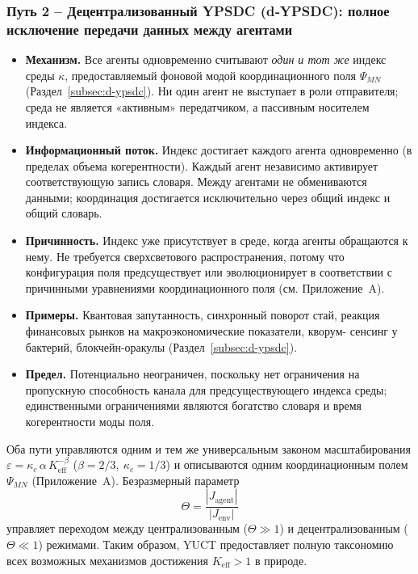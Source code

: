 \documentclass[11pt,a4paper]{article}
\begin{document}
	\subsubsection*{Путь 2 – Децентрализованный YPSDC (d‑YPSDC): полное исключение передачи данных между агентами}
	\begin{itemize}[leftmargin=*]
		\item \textbf{Механизм.} Все агенты одновременно считывают \emph{один и тот же}
		индекс среды \(\kappa\), предоставляемый фоновой модой
		координационного поля \(\Psi_{MN}\) (Раздел~\ref{subsec:d-ypsdc}). Ни один агент
		не выступает в роли отправителя; среда не является «активным» передатчиком, а пассивным
		носителем индекса.
		\item \textbf{Информационный поток.} Индекс достигает каждого агента
		одновременно (в пределах объема когерентности). Каждый агент независимо
		активирует соответствующую запись словаря. Между агентами не обмениваются данными;
		координация достигается исключительно через общий индекс
		и общий словарь.
		\item \textbf{Причинность.} Индекс уже присутствует в среде,
		когда агенты обращаются к нему. Не требуется сверхсветового распространения,
		потому что конфигурация поля предсуществует или эволюционирует в соответствии с причинными
		уравнениями координационного поля (см. Приложение~A).
		\item \textbf{Примеры.} Квантовая запутанность, синхронный поворот
		стай, реакция финансовых рынков на макроэкономические показатели, кворум-
		сенсинг у бактерий, блокчейн-оракулы (Раздел~\ref{subsec:d-ypsdc}).
		\item \textbf{Предел.} Потенциально неограничен, поскольку нет ограничения на пропускную
		способность канала для предсуществующего индекса среды; единственными
		ограничениями являются богатство словаря и время когерентности
		моды поля.
	\end{itemize}
	
	\medskip
	\noindent
	Оба пути управляются одним и тем же универсальным законом масштабирования
	\(\varepsilon = \kappa_c \, \alpha \, K_{\mathrm{eff}}^{-\beta}\)
	(\(\beta = 2/3,\ \kappa_c = 1/3\)) и описываются одним
	координационным полем \(\Psi_{MN}\) (Приложение~A). Безразмерный параметр
	\[
	\Theta = \frac{|J_{\mathrm{agent}}|}{|J_{\mathrm{env}}|}
	\]
	управляет переходом между централизованным (\(\Theta \gg 1\)) и
	децентрализованным (\(\Theta \ll 1\)) режимами. Таким образом, YUCT предоставляет полную
	таксономию всех возможных механизмов достижения \(K_{\mathrm{eff}} > 1\) в природе.
	
\end{document}
